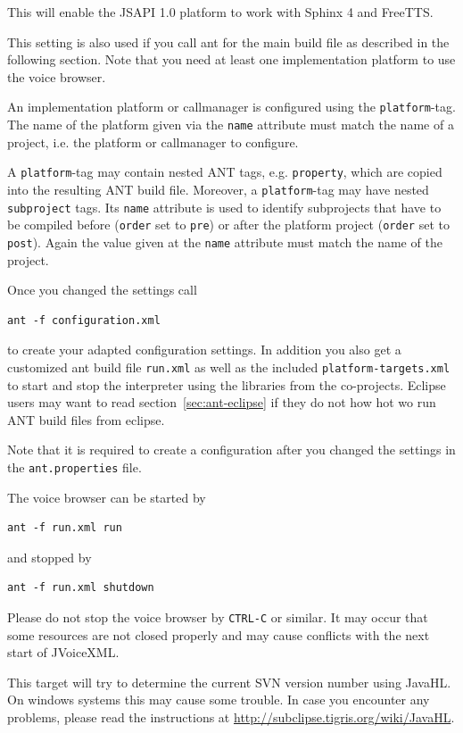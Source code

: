 \documentclass[11pt,a4paper]{article}
\begin{document}
This will enable the JSAPI 1.0 platform to work with Sphinx 4 and FreeTTS. 

This setting is also used if you call ant for the main build file as described
in the following section.
Note that you need at least one implementation platform to use the voice
browser.

An implementation platform or callmanager is configured using the
\lstinline{platform}-tag. The name of the platform given via the
\lstinline{name} attribute must match the name of a project, i.e. the
platform or callmanager to configure.

A \lstinline{platform}-tag may contain nested ANT tags, e.g.
\lstinline{property}, which are copied into the resulting ANT build file. Moreover, a \lstinline{platform}-tag
may have nested \lstinline{subproject} tags. Its \lstinline{name} attribute
is used to identify subprojects that have to be compiled before
(\lstinline{order} set to \texttt{pre}) or after the platform project
(\lstinline{order} set to \texttt{post}). Again the value given at the
\lstinline{name} attribute must match the name of the project.

Once you changed the settings call
\begin{lstlisting}
ant -f configuration.xml
\end{lstlisting}
to create your adapted configuration settings. In addition you also get
a customized ant build file \texttt{run.xml} as well as the included
\texttt{platform-targets.xml} to start and
stop the interpreter using the libraries from the co-projects.
Eclipse users may want to read section~\ref{sec:ant-eclipse} if they do
not how hot wo run ANT build files from eclipse. 

Note that it is required to create a configuration after you changed the
settings in the \texttt{ant.properties} file.

The voice browser can be started by
\begin{lstlisting}
ant -f run.xml run
\end{lstlisting}
and stopped by
\begin{lstlisting}
ant -f run.xml shutdown
\end{lstlisting}

Please do not stop the voice browser by \texttt{CTRL-C} or similar. It may occur
that some resources are not closed properly and may cause conflicts with the next
start of JVoiceXML.

This target will try to determine the current SVN version number using JavaHL. On
windows systems this may cause some trouble. In case you encounter any problems,
please read the instructions at \url{http://subclipse.tigris.org/wiki/JavaHL}.
\end{document}
